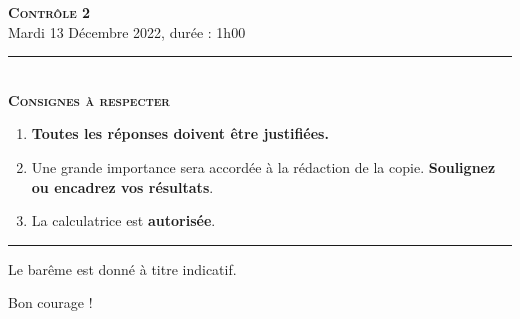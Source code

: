 \documentclass[11pt]{article}
\begin{document}

\begin{center}
\textbf{\LARGE \textsc{Contrôle 2}}\\[2mm]

{\large Mardi 13 Décembre 2022, durée : 1h00}\\[1mm]
\noindent\rule{8cm}{0.4pt}\\[1mm]
\textbf{\textsc{Consignes à respecter}}
\begin{enumerate}[label=\textbf{\arabic*/}]
\item \textbf{Toutes les réponses doivent être justifiées.}
\item Une grande importance sera accordée à la rédaction de la
  copie. \textbf{Soulignez ou encadrez vos résultats}.
\item La calculatrice est \textbf{autorisée}.
    \end{enumerate}
\noindent\rule{12cm}{0.4pt}
\end{center}

\vspace{2mm}
\noindent Le barême est donné à titre indicatif.
\vspace{2mm}
\begin{center}
  Bon courage !
\end{center}
\end{document}
